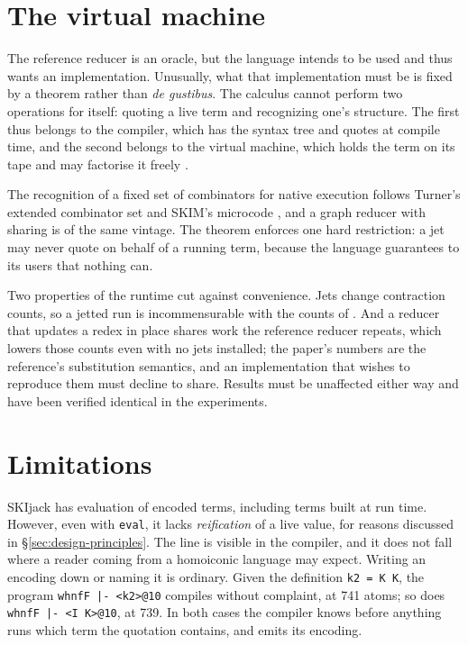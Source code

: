 \documentclass[english,submission,code=tt]{programming}
\begin{document}
\section{The virtual machine}\label{sec:runtime}

The reference reducer is an oracle, but the language intends to be
used and thus wants an implementation.  Unusually, what that 
implementation must be is fixed by a theorem rather than
\emph{de gustibus}.  The calculus cannot perform two operations for itself: quoting a live 
term and recognizing one's structure. The first thus belongs to the 
compiler, which has the syntax tree and quotes at compile time, and the 
second belongs to the virtual machine, which holds the term on its tape 
and may factorise it freely \citep{JayGivenWilson2011}.  %

The recognition of a fixed set of combinators for native execution
follows Turner's extended combinator set and SKIM's microcode
\citep{Turner1979,ClarkeEtAl1980,StoyeClarkeNorman1984}, and a graph
reducer with sharing is of the same vintage.  The theorem enforces
one hard restriction: a jet may never quote on behalf of a running 
term, because the language guarantees to its users that nothing can.

Two properties of the runtime cut against convenience.  Jets change 
contraction counts, so a jetted run is incommensurable with the counts 
of \citet{Davis2027}.  And a reducer that updates a redex in place 
shares work the reference reducer repeats, which lowers those counts 
even with no jets installed; the paper's numbers are the reference's 
substitution semantics, and an implementation that wishes to reproduce 
them must decline to share. Results must be unaffected either way and 
have been verified identical in the experiments.  %

\section{Limitations}\label{sec:limits}

SKIjack has evaluation of encoded terms, including terms built at
run time.  However, even with \texttt{eval}, it lacks
\emph{reification} of a live value, for reasons discussed in
\S\ref{sec:design-principles}.
The line is visible in the compiler, and it does not fall where a
reader coming from a homoiconic language may expect.  Writing an 
encoding down or naming it is ordinary.  Given the definition
\texttt{k2 = K K}, the program \texttt{whnfF |- <k2>@10} compiles
without complaint, at 741 atoms; so does \texttt{whnfF |- <I K>@10}, at
739.  In both cases the compiler knows before anything runs which term 
the quotation contains, and emits its encoding.
\end{document}
